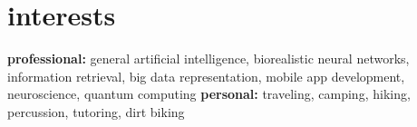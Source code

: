 \documentclass[]{friggeri-cv} %
\begin{document}

\section{interests}

\textbf{professional:} general artificial intelligence, biorealistic neural networks, information retrieval, big data representation, mobile app development, neuroscience, quantum computing \textbf{personal:} traveling, camping, hiking, percussion, tutoring, dirt biking
\end{document}
